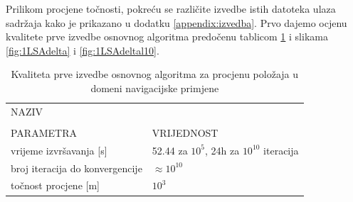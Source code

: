\documentclass[a4paper,twoside,12pt]{memoir} %
\begin{document}
Prilikom procjene točnosti, pokreću se različite izvedbe istih datoteka ulaza sadržaja kako je prikazano u dodatku \ref{appendix:izvedba}.
\vspace{0.01cm}
Prvo dajemo ocjenu kvalitete prve izvedbe osnovnog algoritma predočenu tablicom \ref{table:QR} i slikama \ref{fig:1LSAdelta} i \ref{fig:1LSAdeltal10}.%
\begin{table}[H]
	\caption{Kvaliteta prve izvedbe osnovnog algoritma za procjenu položaja u domeni navigacijske primjene}
	\begin{center}
		\begin{tabular}{|p{3cm}|p{4cm}|}
			\hline
			\rowcolor{lightgray}NAZIV&   \\
			\rowcolor{lightgray}&   \\
			\multirow{-3}{1cm}{ \cellcolor{lightgray}PARAMETRA} & \multirow{-3}{1cm}{\cellcolor{lightgray}VRIJEDNOST} \\
			\hline
			\vspace{0.1cm}
			vrijeme izvršavanja [s] & \vspace{0.1cm}  52.44 za $10^5$, 24h za $10^10$ iteracija\\
			\vspace{0.1cm}
			broj iteracija do konvergencije & \vspace{0.1cm} $\approx 10^10$ \\
			\vspace{0.1cm}
			točnost procjene [m] & \vspace{0.1cm} $10^3$ \\
			\hline
		\end{tabular}
	\end{center}
	\label{table:QR}
\end{table}
\end{document}
